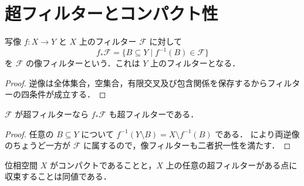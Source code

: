 \section{超フィルターとコンパクト性}
\begin{defn}[フィルターの像]
写像 $f:X\to Y$ と $X$ 上のフィルター $\mathcal F$ に対して
\[
 f_*\mathcal F=\{B\subseteq Y\mid f^{-1}(B)\in\mathcal F\}
\]
を $\mathcal F$ の像フィルターという．これは $Y$ 上のフィルターとなる．
\end{defn}
\begin{proof}
逆像は全体集合，空集合，有限交叉及び包含関係を保存するからフィルターの四条件が成立する．
\end{proof}
\begin{prop}[超フィルターの像]
$\mathcal F$ が超フィルターなら $f_*\mathcal F$ も超フィルターである．
\end{prop}
\begin{proof}
任意の $B\subseteq Y$ について $f^{-1}(Y\setminus B)=X\setminus f^{-1}(B)$ である． により両逆像のちょうど一方が $\mathcal F$ に属するので，像フィルターも二者択一性を満たす．
\end{proof}
\begin{prop}[超フィルターによるコンパクト性の判定]
位相空間 $X$ がコンパクトであることと，$X$ 上の任意の超フィルターがある点に収束することは同値である．
\end{prop}
